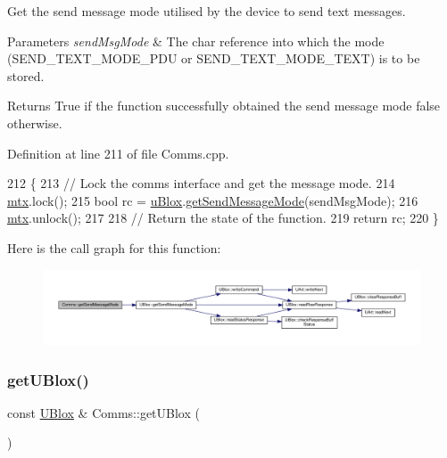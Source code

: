 Get the send message mode utilised by the device to send text messages.


\begin{DoxyParams}{Parameters}
{\em send\+Msg\+Mode} & The char reference into which the mode (S\+E\+N\+D\+\_\+\+T\+E\+X\+T\+\_\+\+M\+O\+D\+E\+\_\+\+P\+DU or S\+E\+N\+D\+\_\+\+T\+E\+X\+T\+\_\+\+M\+O\+D\+E\+\_\+\+T\+E\+XT) is to be stored. \\
\hline
\end{DoxyParams}
\begin{DoxyReturn}{Returns}
True if the function successfully obtained the send message mode false otherwise. 
\end{DoxyReturn}


Definition at line 211 of file Comms.\+cpp.


\begin{DoxyCode}
212 \{
213     \textcolor{comment}{// Lock the comms interface and get the message mode.}
214     \hyperlink{class_comms_a21df861b1202573e4cd0cb5666d638fe}{mtx}.lock();
215     \textcolor{keywordtype}{bool} rc = \hyperlink{class_comms_ac64dea134b116147e5441172346dbd6c}{uBlox}.\hyperlink{class_u_blox_aee30d82dcf52335d19f77e766db78ab4}{getSendMessageMode}(sendMsgMode);
216     \hyperlink{class_comms_a21df861b1202573e4cd0cb5666d638fe}{mtx}.unlock();
217 
218     \textcolor{comment}{// Return the state of the function.}
219     \textcolor{keywordflow}{return} rc;
220 \}
\end{DoxyCode}
Here is the call graph for this function\+:\nopagebreak
\begin{figure}[H]
\begin{center}
\leavevmode
\includegraphics[width=350pt]{d8/dcc/class_comms_ade9963ad1f934a79a6b584dd7abfe515_cgraph}
\end{center}
\end{figure}
\mbox{\label{class_comms_afdd15b4aeca5d91f2f263910c444c957}} 
\subsubsection{\texorpdfstring{get\+U\+Blox()}{getUBlox()}}
{\footnotesize\ttfamily const \hyperlink{class_u_blox}{U\+Blox} \& Comms\+::get\+U\+Blox (\begin{DoxyParamCaption}{ }\end{DoxyParamCaption})}

